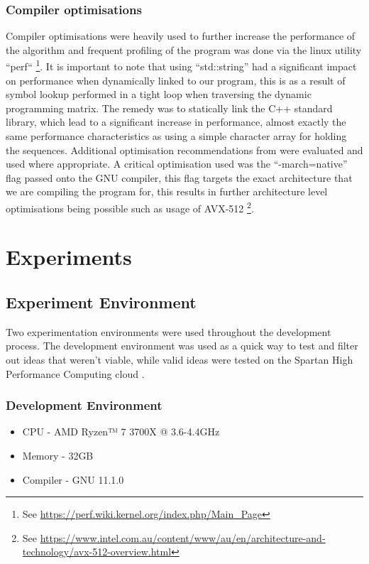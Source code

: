 \documentclass[manuscript,screen, nonacm=true]{acmart}
\begin{document}
\subsubsection{Compiler optimisations}
Compiler optimisations were heavily used to further increase the performance of the algorithm and frequent profiling of the program was done via the linux utility ``perf`` \footnote{See \url{https://perf.wiki.kernel.org/index.php/Main_Page}}. It is important to note that using ``std::string'' had a significant impact on performance when dynamically linked to our program, this is as a result of symbol lookup performed in a tight loop when traversing the dynamic programming matrix. The remedy was to statically link the C++ standard library, which lead to a significant increase in performance, almost exactly the same performance characteristics as using a simple character array for holding the sequences. Additional optimisation recommendations from \cite{fog2020optimizing} were evaluated and used where appropriate. A critical optimisation used was the ``-march=native'' flag passed onto the GNU compiler, this flag targets the exact architecture that we are compiling the program for, this results in further architecture level optimisations being possible such as usage of AVX-512 \footnote{See \url{https://www.intel.com.au/content/www/au/en/architecture-and-technology/avx-512-overview.html}}.

\section{Experiments}

\subsection{Experiment Environment}
Two experimentation environments were used throughout the development process. The development environment was used as a quick way to test and filter out
ideas that weren't viable, while valid ideas were tested on the Spartan High Performance Computing cloud \cite{lafayette2017hpc}. 
\subsubsection{Development Environment}
\begin{itemize}
    \item CPU - AMD Ryzen™ 7 3700X @ 3.6-4.4GHz
    \item Memory - 32GB
    \item Compiler - GNU 11.1.0
\end{itemize}
\end{document}
